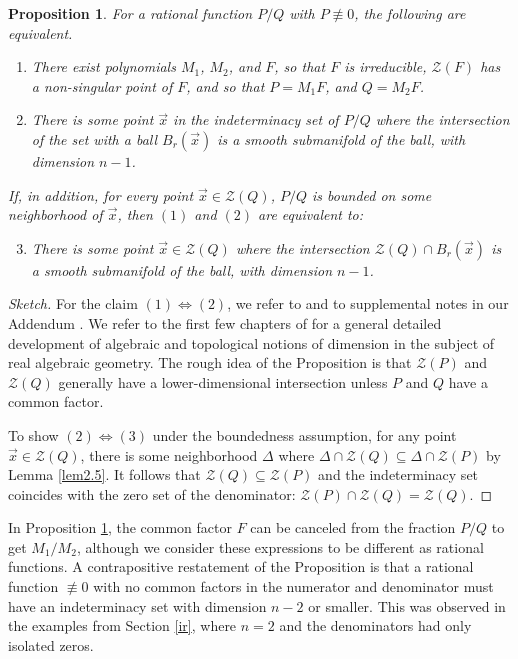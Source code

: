 \documentclass[12pt]{amsart}
\newtheorem{prop}[thm]{Proposition}
\theoremstyle{definition}
\theoremstyle{remark}
\numberwithin{equation}{section}
\newcommand{\vv}{\mathcal{Z}}
\begin{document}
\begin{prop}\label{prop2.4}
  For a rational function $P/Q$ with $P\not\equiv0$, the following are equivalent.
   \begin{enumerate}
      \item There exist polynomials $M_1$, $M_2$, and $F$, so that $F$ is irreducible, $\vv(F)$ has a non-singular point of $F$, and so that $P=M_1F$, and $Q=M_2F$.
      \item There is some point $\vec x$ in the indeterminacy set of $P/Q$ where the intersection of the set with a ball $B_r(\vec x)$ is a smooth submanifold of the ball, with dimension $n-1$.
  \end{enumerate}
  If, in addition, for every point $\vec x\in\vv(Q)$, $P/Q$ is bounded on some neighborhood of $\vec x$, then $(1)$ and $(2)$ are equivalent to:
  \begin{enumerate}\setcounter{enumi}{2}
      \item There is some point $\vec x\in\vv(Q)$ where the intersection $\vv(Q)\cap B_r(\vec x)$ is a smooth submanifold of the ball, with dimension $n-1$.
  \end{enumerate}
\end{prop}
\begin{proof}[Sketch]
  For the claim $(1)\iff(2)$, we refer to \cite{dfp} and to supplemental notes in our Addendum \cite{cp}.  We refer to the first few chapters of \cite{bcr} for a general detailed development of algebraic and topological notions of dimension in the subject of real algebraic geometry.  The rough idea of the Proposition is that $\vv(P)$ and $\vv(Q)$ generally have a lower-dimensional intersection unless $P$ and $Q$ have a common factor.%

  To show $(2)\iff(3)$ under the boundedness assumption, for any point $\vec x\in\vv(Q)$, there is some neighborhood $\Delta$ where $\Delta\cap\vv(Q)\subseteq\Delta\cap\vv(P)$ by Lemma \ref{lem2.5}.  It follows that $\vv(Q)\subseteq\vv(P)$ and the indeterminacy set coincides with the zero set of the denominator: $\vv(P)\cap\vv(Q)=\vv(Q)$.
\end{proof}
In Proposition \ref{prop2.4}, the common factor $F$ can be canceled from the fraction $P/Q$ to get $M_1/M_2$, although we consider these expressions to be different as rational functions.  A contrapositive restatement of the Proposition is that a rational function $\not\equiv0$ with no common factors in the numerator and denominator must have an indeterminacy set with dimension $n-2$ or smaller.  This was observed in the examples from Section \ref{ir}, where $n=2$ and the denominators had only isolated zeros.
\end{document}
